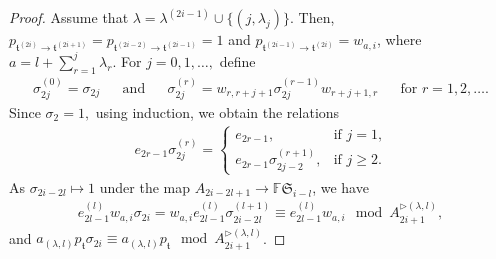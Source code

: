 \documentclass[11pt,a4paper,reqno,svgnames]{amsart}
\theoremstyle{plain}
\theoremstyle{definition}
\numberwithin{equation}{section}
\begin{document}
\begin{proof}
Assume that  $\lambda=\lambda^{(2i-1)}\cup{\lbrace}(j,\lambda_j){\rbrace}$. Then, $p_{\mathfrak{t}^{(2i)}\to\mathfrak{t}^{(2i+1)}} =p_{\mathfrak{t}^{(2i-2)}\to\mathfrak{t}^{(2i-1)}}=1$ and $p_{\mathfrak{t}^{(2i-1)}\to\mathfrak{t}^{(2i)}}=w_{a,i}$, where $a= l +\sum_{r=1}^j\lambda_r$.  
For $j=0,1,\ldots,$ define
\begin{align*}
\sigma_{2j}^{(0)}=\sigma_{2j}&&\text{and}&&
\sigma_{2j}^{(r)}=w_{r,r+j+1}\sigma_{2j}^{(r-1)}w_{r+j+1,r}&&\text{for $r=1,2,\ldots.$}
\end{align*}
Since ${\sigma}_{2}=1,$ using induction, we obtain the relations
\begin{align*}
e_{2r-1}\sigma_{2j}^{(r)}=
\begin{cases}
e_{2r-1},&\text{if $j=1$,}\\
e_{2r-1}\sigma_{2j-2}^{(r+1)},
&\text{if $j{\geqslant}2.$}
\end{cases}
\end{align*}
As $\sigma_{2i-2l}\mapsto 1$ under the map $A_{2i-2l+1}\to \mathbb{F}\mathfrak{S}_{i-l}$, we have
\begin{align*}
e_{2l-1}^{(l)}w_{a,i}\sigma_{2i}=w_{a,i}e_{2l-1}^{(l)}\sigma_{2i-2l}^{(l+1)}\equiv e_{2l-1} ^{(l)} w_{a,i} \mod A_{2i+1}^{\rhd(\lambda, l )},
\end{align*}
and $a_{(\lambda,l)}p_\mathfrak{t}\sigma_{2i}\equiv a_{(\lambda,l)}p_\mathfrak{t}\mod A_{2i+1}^{\rhd(\lambda,l)}$. 
\end{proof}
\end{document}
